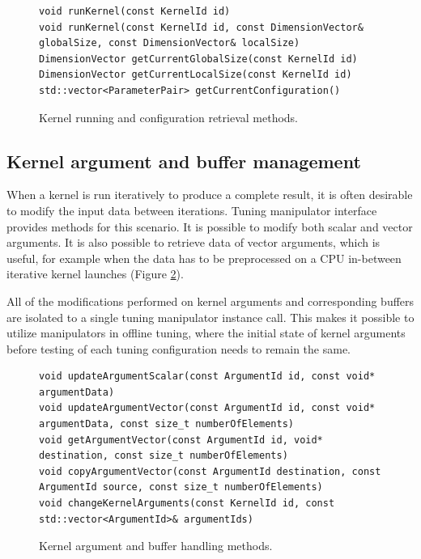 \documentclass
[
    digital, %
    oneside, %
    table, %
    nolof, %
    nolot, %
    nocover %
]{fithesis3}
\begin{document}
\begin{figure}
\begin{adjustwidth}{-1cm}{-1cm}
\begin{lstlisting}
void runKernel(const KernelId id)
void runKernel(const KernelId id, const DimensionVector& globalSize, const DimensionVector& localSize)
DimensionVector getCurrentGlobalSize(const KernelId id)
DimensionVector getCurrentLocalSize(const KernelId id)
std::vector<ParameterPair> getCurrentConfiguration()
\end{lstlisting}
\caption{Kernel running and configuration retrieval methods.}
\label{ktt-manipulator-kernel-methods}
\end{adjustwidth}
\end{figure}

\subsection{Kernel argument and buffer management}
When a kernel is run iteratively to produce a complete result, it is often desirable to modify the input data between iterations. Tuning manipulator
interface provides methods for this scenario. It is possible to modify both scalar and vector arguments. It is also possible to retrieve data of
vector arguments, which is useful, for example when the data has to be preprocessed on a CPU in-between iterative kernel launches (Figure
\ref{ktt-manipulator-buffer-methods}).

All of the modifications performed on kernel arguments and corresponding buffers are isolated to a single tuning manipulator instance call. This makes
it possible to utilize manipulators in offline tuning, where the initial state of kernel arguments before testing of each tuning configuration needs to
remain the same.

\begin{figure}
\begin{adjustwidth}{-1cm}{-1cm}
\begin{lstlisting}
void updateArgumentScalar(const ArgumentId id, const void* argumentData)
void updateArgumentVector(const ArgumentId id, const void* argumentData, const size_t numberOfElements)
void getArgumentVector(const ArgumentId id, void* destination, const size_t numberOfElements)
void copyArgumentVector(const ArgumentId destination, const ArgumentId source, const size_t numberOfElements)
void changeKernelArguments(const KernelId id, const std::vector<ArgumentId>& argumentIds)
\end{lstlisting}
\caption{Kernel argument and buffer handling methods.}
\label{ktt-manipulator-buffer-methods}
\end{adjustwidth}
\end{figure}
\end{document}
